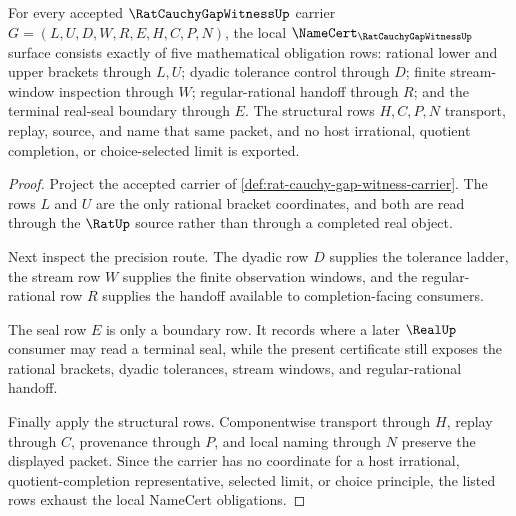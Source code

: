 \begin{theorem}
\label{thm:rat-cauchy-gap-witness-namecert-obligations}
For every accepted $\RatCauchyGapWitnessUp$ carrier $G=(L,U,D,W,R,E,H,C,P,N)$, the local $\NameCert_{\RatCauchyGapWitnessUp}$ surface consists exactly of five mathematical obligation rows: rational lower and upper brackets through $L,U$; dyadic tolerance control through $D$; finite stream-window inspection through $W$; regular-rational handoff through $R$; and the terminal real-seal boundary through $E$. The structural rows $H,C,P,N$ transport, replay, source, and name that same packet, and no host irrational, quotient completion, or choice-selected limit is exported.
\end{theorem}
\begin{proof}
Project the accepted carrier of \autoref{def:rat-cauchy-gap-witness-carrier}. The rows $L$ and $U$ are the only rational bracket coordinates, and both are read through the $\RatUp$ source rather than through a completed real object.

Next inspect the precision route. The dyadic row $D$ supplies the tolerance ladder, the stream row $W$ supplies the finite observation windows, and the regular-rational row $R$ supplies the handoff available to completion-facing consumers.

The seal row $E$ is only a boundary row. It records where a later $\RealUp$ consumer may read a terminal seal, while the present certificate still exposes the rational brackets, dyadic tolerances, stream windows, and regular-rational handoff.

Finally apply the structural rows. Componentwise transport through $H$, replay through $C$, provenance through $P$, and local naming through $N$ preserve the displayed packet. Since the carrier has no coordinate for a host irrational, quotient-completion representative, selected limit, or choice principle, the listed rows exhaust the local NameCert obligations.
\end{proof}



